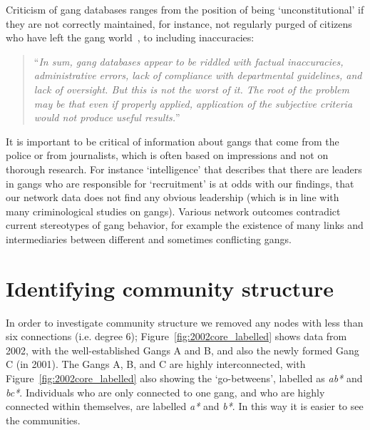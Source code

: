 \documentclass[twocolumn]{svjour3}          %
\theoremstyle{definition}
\begin{document}
Criticism of gang databases ranges from the position of being
`unconstitutional' if they are not correctly maintained, for instance,
not regularly purged of citizens who have left the gang
world~\citep{jacobs:2009}, to including inaccuracies:

\begin{quote}
``{\emph{In sum, gang databases appear to be riddled
with factual inaccuracies, administrative errors, lack of compliance
with departmental guidelines, and lack of oversight. But this is not
the worst of it. The root of the problem may be that even if properly
applied, application of the subjective criteria would not produce
useful results.}}''\\ \cite{wright:2005}
\end{quote}


It is important to be critical of information about gangs that come
from the police or from journalists, which is often based on
impressions and not on thorough research. For instance `intelligence'
that describes that there are leaders in gangs who are responsible for
`recruitment' is at odds with our findings, that our network data does
not find any obvious leadership (which is in line with many
criminological studies on gangs). Various network outcomes contradict
current stereotypes of gang behavior, for example the existence of
many links and intermediaries between different and sometimes
conflicting gangs.


\section{Identifying community structure}\label{sec:communitystructure}

In order to investigate community structure we removed any nodes with
less than six connections (i.e. degree 6);
Figure~\ref{fig:2002core_labelled} shows data from 2002, with the
well-established Gangs A and B, and also the newly formed Gang C (in
2001). The Gangs A, B, and C are highly interconnected, with
Figure~\ref{fig:2002core_labelled} also showing the `go-betweens',
labelled as \emph{ab*} and \emph{bc*}. Individuals who are only
connected to one gang, and who are highly connected within themselves,
are labelled \emph{a*} and \emph{b*}. In this way it is easier to see
the communities.
\end{document}

